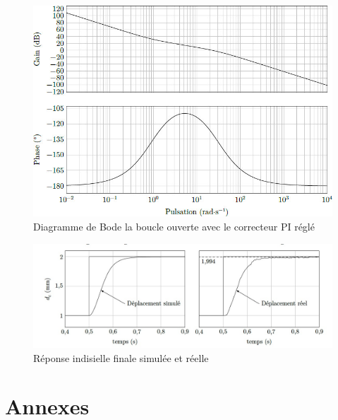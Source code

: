\ifprof
\else
\begin{figure}[H]
\begin{center}
\includegraphics[width=.8\textwidth]{images/image_fig19}
\caption{Diagramme de Bode la boucle ouverte avec le correcteur PI réglé\label{fig_19}}
\end{center}
\end{figure}

\begin{figure}[H]
\begin{center}
\includegraphics[width=1.0\textwidth]{images/image_simu.jpg}
\caption{Réponse indisielle finale simulée et réelle \label{fig_simu}}
\end{center}
\end{figure}




\section{Annexes}


